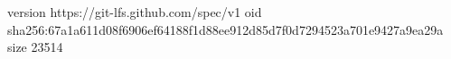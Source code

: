 version https://git-lfs.github.com/spec/v1
oid sha256:67a1a611d08f6906ef64188f1d88ee912d85d7f0d7294523a701e9427a9ea29a
size 23514
